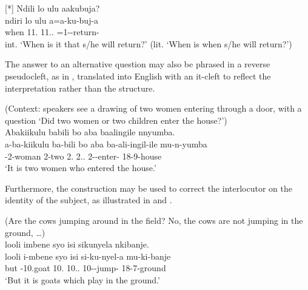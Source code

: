 \documentclass[output=paper]{langscibook}
\begin{document}
\z

\ea
[*]{
\label{bkm:Ref122708500}
Ndili lo ulu aakubuja?\\
\gll
ndiri  lo  ulu  a=a-ku-buj-a\\
when  11.\IDCOP{}  11.\DEM.\PROX{}  \FUT{}=1\SM{}-\PRS{}-return-\FV{}\\
\glt
int. ‘When is it that s/he will return?’ (lit. ‘When is when s/he will return?’)\\
}

\z

The answer to an alternative question may also be phrased in a reverse pseudocleft, as in , translated into English with an it-cleft to reflect the interpretation rather than the structure.

\ea
\label{bkm:Ref123834919}
(Context: speakers see a drawing of two women entering through a door, with a question ‘Did two women or two children enter the house?’)\\
Abakiikulu babili bo aba baalingile nnyumba.\\
\gll
a-ba-kiikulu  ba-bili  bo  aba  ba-ali-ingil-ile  mu-n-yumba\\
\AUG{}-2-woman  2-two  2.\IDCOP{}  2.\DEM.\PROX{}  2\SM{}-\PST{}-enter-\PFV{}  18-9-house\\
\glt
‘It is two women who entered the house.’\\

\z


Furthermore, the construction may be used to correct the interlocutor on the identity of the subject, as illustrated in  and .

\ea
\label{bkm:Ref136510603}
(Are the cows jumping around in the field? No, the cows are not jumping in the ground, …)\\
looli imbene syo isi sikunyela nkibanje.\\
\gll
looli  i-mbene  syo  isi  si-ku-nyel-a  mu-ki-banje\\
but  \AUG{}-10.goat  10.\IDCOP{}  10.\DEM.\PROX{}  10\SM-\PRS{}-jump-\FV{}  18-7-ground\\
\glt
‘But it is goats which play in the ground.’\\

\z
\end{document}
